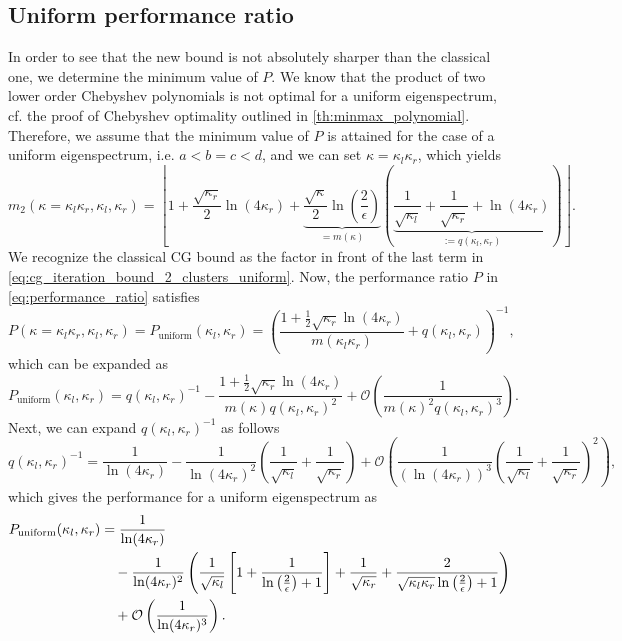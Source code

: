 \subsection{Uniform performance ratio}\label{sec:cg_sharpened_convrate_uniform_performance}
In order to see that the new bound is not absolutely sharper than the classical one, we determine the minimum value of $P$. We know that the product of two lower order Chebyshev polynomials is not optimal for a uniform eigenspectrum, cf. the proof of Chebyshev optimality outlined in \cref{th:minmax_polynomial}. Therefore, we assume that the minimum value of $P$ is attained for the case of a uniform eigenspectrum, i.e. $a<b=c<d$, and we can set $\kappa=\kappa_l\kappa_r$, which yields
\begin{equation}
    m_2(\kappa=\kappa_l\kappa_r, \kappa_l, \kappa_r)=\left\lfloor
        1 
        + \frac{\sqrt{\kappa_r}}{2}\ln\left(4\kappa_r\right)
        + \underbrace{\frac{\sqrt{\kappa}}{2}\ln\left(\frac{2}{\epsilon}\right)}_{=m(\kappa)}\left(
            \underbrace{
                \frac{1}{\sqrt{\kappa_l}}
                + \frac{1}{\sqrt{\kappa_r}}
                + \ln\left(4\kappa_r\right)
            }_{:= q(\kappa_l, \kappa_r)}
        \right)
    \right\rfloor.
    \label{eq:cg_iteration_bound_2_clusters_uniform}
\end{equation}
We recognize the classical CG bound as the factor in front of the last term in \cref{eq:cg_iteration_bound_2_clusters_uniform}. Now, the performance ratio $P$ in \cref{eq:performance_ratio} satisfies
\begin{equation}
    P(\kappa=\kappa_l\kappa_r, \kappa_l, \kappa_r) = P_{\text{uniform}}(\kappa_l, \kappa_r) = \left(\frac{1 + \frac{1}{2}\sqrt{\kappa_r}\ln(4\kappa_r)}{m(\kappa_l\kappa_r)} + q(\kappa_l, \kappa_r)\right)^{-1},
    \label{eq:performance_ratio_uniform}
\end{equation}
which can be expanded as
\[
    P_{\text{uniform}}(\kappa_l, \kappa_r) = q(\kappa_l, \kappa_r)^{-1} - \frac{1 + \frac{1}{2}\sqrt{\kappa_r}\ln(4\kappa_r)}{m(\kappa)q(\kappa_l, \kappa_r)^2} + \mathcal{O}\left(\frac{1}{m(\kappa)^2q(\kappa_l, \kappa_r)^3}\right).
\]
Next, we can expand $q(\kappa_l, \kappa_r)^{-1}$ as follows
\[
    q(\kappa_l, \kappa_r)^{-1} = \frac{1}{\ln(4\kappa_r)} - \frac{1}{\ln(4\kappa_r)^2}\left(\frac{1}{\sqrt{\kappa_l}} + \frac{1}{\sqrt{\kappa_r}}\right) + \mathcal{O}\left(\frac{1}{(\ln(4\kappa_r))^3}\left(\frac{1}{\sqrt{\kappa_l}} + \frac{1}{\sqrt{\kappa_r}}\right)^2\right),
\]
which gives the performance for a uniform eigenspectrum as
\begin{align}
    P_{\text{uniform}}(\kappa_l, \kappa_r) &= \frac{1}{\ln(4\kappa_r)} \notag \\
    &\quad - \frac{1}{\ln(4\kappa_r)^2}\left(\frac{1}{\sqrt{\kappa_l}}\left[1 + \frac{1}{\ln\left(\frac{2}{\epsilon}\right) + 1}\right] + \frac{1}{\sqrt{\kappa_r}} + \frac{2}{\sqrt{\kappa_l\kappa_r}\ln\left(\frac{2}{\epsilon}\right) + 1}\right) \notag \\
    &\quad + \mathcal{O}\left(\frac{1}{\ln(4\kappa_r)^3}\right).
    \label{eq:performance_ratio_uniform_expansion}
\end{align}


